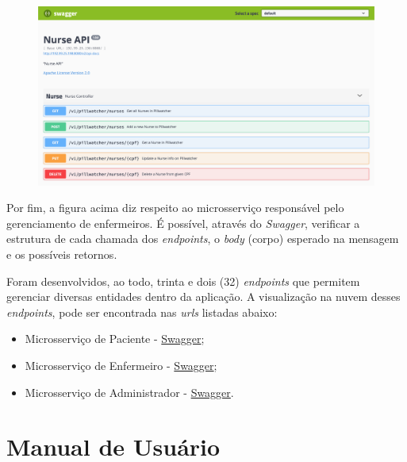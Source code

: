 \begin{apendicesenv}
\begin{figure}[H]
    \centering
    \includegraphics[width=1.0\textwidth,page=1]{figuras/software/SwaggerUi/SwaggerUi_Nurse.png}
    \label{fig:nurse_endpoints}
\end{figure}

Por fim, a figura acima diz respeito ao microsserviço responsável pelo gerenciamento de enfermeiros. É possível, através do \textit{Swagger}, verificar a estrutura de cada chamada dos \textit{endpoints}, o \textit{body} (corpo) esperado na mensagem e os possíveis retornos. 

Foram desenvolvidos, ao todo, trinta e dois (32) \textit{endpoints} que permitem gerenciar diversas entidades dentro da aplicação. A visualização na nuvem desses \textit{endpoints}, pode ser encontrada nas \textit{urls} listadas abaixo:

\begin{itemize}
    \item Microsserviço de Paciente - \href{http://192.99.25.198:8082/swagger-ui.html}{Swagger};
    \item Microsserviço de Enfermeiro - \href{http://192.99.25.198:8080/swagger-ui.html}{Swagger};
    \item Microsserviço de Administrador - \href{http://192.99.25.198:8081/swagger-ui.html}{Swagger}.
\end{itemize}


\chapter{Manual de Usuário}\label{manual_usuario}


\end{apendicesenv}
